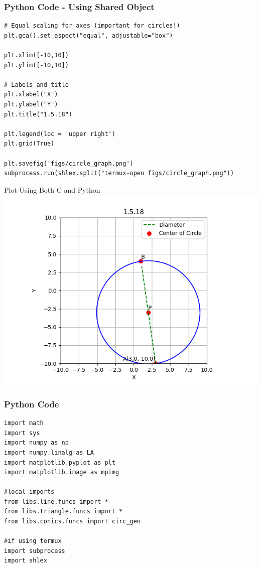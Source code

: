 \documentclass{beamer}
\begin{document}
\begin{frame}[fragile]
    \frametitle{Python Code - Using Shared Object}
    \begin{lstlisting}
# Equal scaling for axes (important for circles!)
plt.gca().set_aspect("equal", adjustable="box")

plt.xlim([-10,10])
plt.ylim([-10,10])

# Labels and title
plt.xlabel("X")
plt.ylabel("Y")
plt.title("1.5.18")

plt.legend(loc = 'upper right')
plt.grid(True)

plt.savefig('figs/circle_graph.png')
subprocess.run(shlex.split("termux-open figs/circle_graph.png"))

    \end{lstlisting}
\end{frame}

\begin{frame}{Plot-Using Both C and Python}
    \centering
    \includegraphics[width=\columnwidth, height=0.8\textheight, keepaspectratio]{figs/circle_graph.png}     
\end{frame}

\begin{frame}[fragile]
    \frametitle{Python Code}
    \begin{lstlisting}
import math
import sys
import numpy as np
import numpy.linalg as LA
import matplotlib.pyplot as plt
import matplotlib.image as mpimg

#local imports
from libs.line.funcs import *
from libs.triangle.funcs import *
from libs.conics.funcs import circ_gen

#if using termux
import subprocess
import shlex
\end{lstlisting}
\end{frame}
\end{document}

